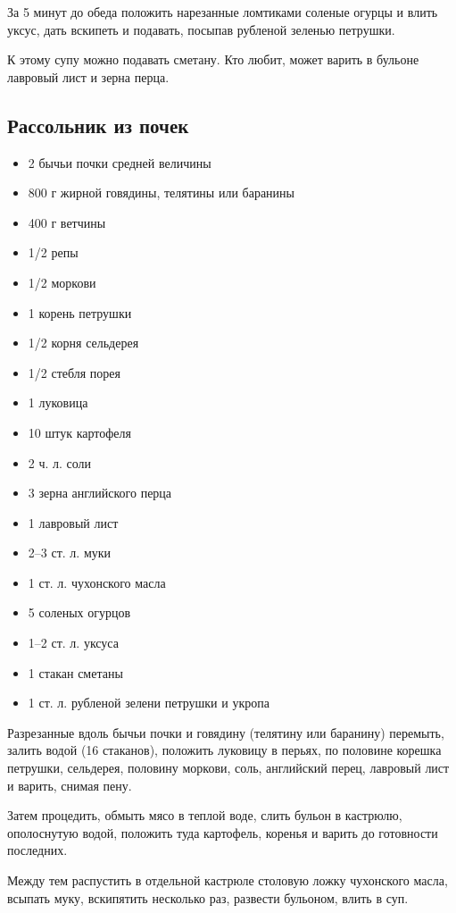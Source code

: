 За 5 минут до обеда положить нарезанные ломтиками соленые огурцы и влить уксус, дать вскипеть и подавать, посыпав рубленой зеленью петрушки.

К этому супу можно подавать сметану. Кто любит, может варить в бульоне лавровый лист и зерна перца.

\subsection{Рассольник из почек}\label{34rassolnik-pochki}

\begin{itemize}
	\item 2 бычьи почки средней величины
    \item 800 г жирной говядины, телятины или баранины 
    \item 400 г ветчины 
    \item 1/2 репы
    \item 1/2 моркови 
    \item 1 корень петрушки 
    \item 1/2 корня сельдерея 
    \item 1/2 стебля порея 
    \item 1 луковица
    \item 10 штук картофеля
    \item 2 ч. л. соли
    \item 3 зерна английского перца
    \item 1 лавровый лист
    \item 2–3 ст. л. муки 
    \item 1 ст. л. чухонского масла 
    \item 5 соленых огурцов
    \item 1–2 ст. л. уксуса 
    \item 1 стакан сметаны 
    \item 1 ст. л. рубленой зелени петрушки и укропа
\end{itemize}

Разрезанные вдоль бычьи почки и говядину (телятину или баранину) перемыть, залить водой (16 стаканов), положить луковицу в перьях, по половине корешка петрушки, сельдерея, половину моркови, соль, английский перец, лавровый лист и варить, снимая пену.

Затем процедить, обмыть мясо в теплой воде, слить бульон в кастрюлю, ополоснутую водой, положить туда картофель, коренья и варить до готовности последних.

Между тем распустить в отдельной кастрюле столовую ложку чухонского масла, всыпать муку, вскипятить несколько раз, развести бульоном, влить в суп.

